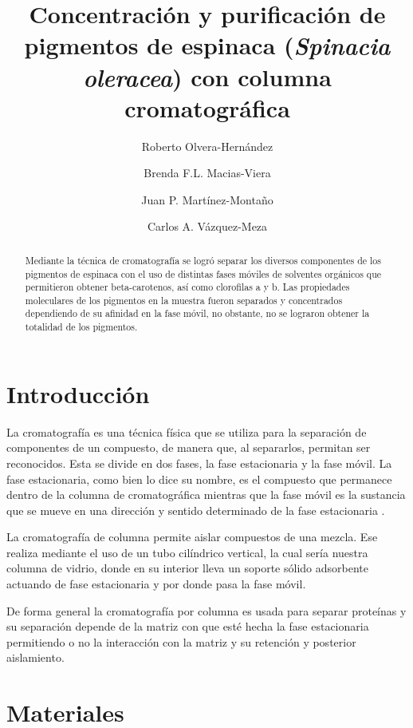 \documentclass{ITESO-Reporte}
\title{Concentración y purificación de pigmentos de espinaca (\textit{Spinacia oleracea}) con columna cromatográfica}
\author[a]{Roberto Olvera-Hernández} %
\author[a]{Brenda F.L. Macias-Viera}
\author[a]{Juan P. Martínez-Montaño}
\author[a]{Carlos A. Vázquez-Meza}
\date{} %
\affil[a]{Ingeniería en biotecnología, \itesoinfo}
\begin{document}
\maketitle %
    \nocite{*} %
    {\small \tableofcontents} %
    \thispagestyle{firstpage} %

\begin{abstract}\label{abstract}
    Mediante la técnica de cromatografía se logró separar los diversos componentes de los pigmentos de espinaca con el uso de distintas fases móviles de solventes orgánicos que permitieron obtener beta-carotenos, así como clorofilas a y b. Las propiedades moleculares de los pigmentos en la muestra fueron separados y concentrados dependiendo de su afinidad en la fase móvil, no obstante, no se lograron obtener la totalidad de los pigmentos.
\end{abstract} 
\newpage

\section{Introducción}\label{intro}

La cromatografía es una técnica física que se utiliza para la separación de componentes de un compuesto, de manera que, al separarlos, permitan ser reconocidos. Esta se divide en dos fases, la fase estacionaria y la fase móvil. La fase estacionaria, como bien lo dice su nombre, es el compuesto que permanece dentro de la columna de cromatográfica mientras que la fase móvil es la sustancia que se mueve en una dirección y sentido determinado de la fase estacionaria \parencite{Sgariglia2010}. 

La cromatografía de columna permite aislar compuestos de una mezcla. Ese realiza mediante el uso de un tubo cilíndrico vertical, la cual sería nuestra columna de vidrio, donde en su interior lleva un soporte sólido adsorbente actuando de fase estacionaria y por donde pasa la fase móvil.

De forma general la cromatografía por columna es usada para separar proteínas y su separación depende de la matriz con que esté hecha la fase estacionaria permitiendo o no la interacción con la matriz y su retención y posterior aislamiento.

\section{Materiales}\label{materiales}
\end{document}
